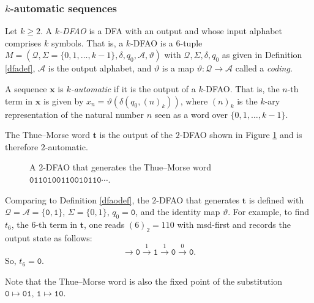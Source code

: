 \documentclass[10pt,a4paper,reqno]{amsart}
\newcommand{\N}{{\mathbb N}}
\newcommand{\bfx}{{\mathbf x}}
\newcommand{\bft}{{\mathbf t}}
\newcommand{\mc}{\mathcal}
\newcommand{\A}{\mc A}
\begin{document}
\subsubsection{\texorpdfstring{$k$}{k}-automatic sequences}
\begin{definition}{\label{dfaodef}}
Let $k\geq2$. A {\em $k$-DFAO} is a DFA with an output and whose input alphabet comprises $k$ symbols. That is, a $k$-DFAO is a $6$-tuple  $M = (\mathcal{Q}, \Sigma=\{0,1,\dots,k-1\}, \delta, q_0, \A, \vartheta)$ with $\mathcal{Q},\Sigma, \delta, q_0$ as given in Definition \ref{dfadef}, $\A$ is the output alphabet, and $\vartheta$ is a map $\vartheta\colon \mathcal{Q} \to \A$ called a {\em coding}. 

A sequence $\bfx$ is {\em $k$-automatic} if it is the output of a $k$-DFAO. That is, the $n$-th term in $\bfx$ is given by $x_n= \vartheta(\delta(q_0,(n)_k))$, where $(n)_k$ is the $k$-ary representation of the natural number $n$ seen as a word over $\{0,1,\ldots, k-1\}$.
\end{definition}
\begin{example}
The Thue--Morse word $\bft$ is the output of the $2$-DFAO shown in Figure \ref{FIG:thuemorsedfao} and is therefore $2$-automatic.
\begin{figure}
\centering
{}

\caption{A $2$-DFAO that generates the Thue--Morse word $\mathtt{0110100110010110\cdots}$.}
\label{FIG:thuemorsedfao}
\end{figure}
Comparing to Definition \ref{dfaodef}, the $2$-DFAO that generates $\bft$ is defined with $\mathcal{Q}=\mc{A}=\{\mathtt{0,1}\}$, $\Sigma=\{0,1\}$, $q_0=\mathtt{0}$, and the identity map $\vartheta$. For example, to find $t_6$, the $6$-th term in $\bft$, one reads $(6)_2=110$ with msd-first and records the output state as follows: \[\rightarrow\mathtt{0}\overset{1}{\longrightarrow}\mathtt{1}\overset{1}{\longrightarrow}\mathtt{0}\overset{0}{\longrightarrow}\mathtt{0}.\] So, $t_6=\mathtt{0}$.

Note that the Thue--Morse word is also the fixed point of the substitution $\mathtt{0}\mapsto \mathtt{01},\, \mathtt{1} \mapsto \mathtt{10}$.
\end{example} 
\end{document}
